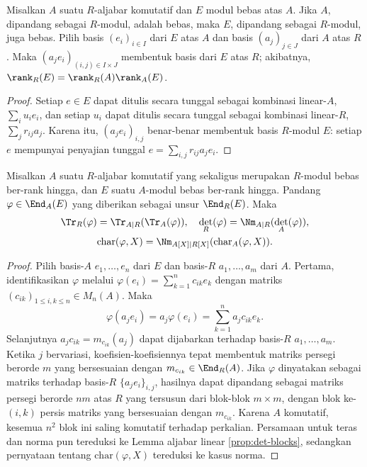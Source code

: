 \begin{lemma}\label{prop:free-transitivity}
	Misalkan $A$ suatu $R$-aljabar komutatif dan $E$ modul bebas atas $A$. Jika $A$, dipandang sebagai $R$-modul, adalah bebas, maka $E$, dipandang sebagai $R$-modul, juga bebas. Pilih basis $(e_i)_{i \in I}$ dari $E$ atas $A$ dan basis $(a_j)_{j \in J}$ dari $A$ atas $R$. Maka $(a_j e_i)_{(i,j) \in I \times J}$ membentuk basis dari $E$ atas $R$; akibatnya, $\rank_R(E) = \rank_R(A) \rank_A(E)$.
\end{lemma}
\begin{proof}
	Setiap $e \in E$ dapat ditulis secara tunggal sebagai kombinasi linear-$A$, $\sum_i u_i e_i$, dan setiap $u_i$ dapat ditulis secara tunggal sebagai kombinasi linear-$R$, $\sum_j r_{ij} a_j$. Karena itu, $(a_j e_i)_{i,j}$ benar-benar membentuk basis $R$-modul $E$: setiap $e$ mempunyai penyajian tunggal $e = \sum_{i,j} r_{ij} a_j e_i$.
\end{proof}

\begin{theorem}\label{prop:norm-trace-transitivity}
	Misalkan $A$ suatu $R$-aljabar komutatif yang sekaligus merupakan $R$-modul bebas ber-rank hingga, dan $E$ suatu $A$-modul bebas ber-rank hingga. Pandang $\varphi \in \End_A(E)$ yang diberikan sebagai unsur $\End_R(E)$. Maka
	\begin{gather*}
		\Tr_R(\varphi) = \Tr_{A|R}(\Tr_A(\varphi)), \quad \det_R(\varphi) = \Nm_{A|R}(\det_A(\varphi)), \\
		\mathrm{char}(\varphi, X) = \Nm_{A[X]|R[X]}(\mathrm{char}_A(\varphi, X)).
	\end{gather*}
\end{theorem}
\begin{proof}
	Pilih basis-$A$ $e_1, \ldots, e_n$ dari $E$ dan basis-$R$ $a_1, \ldots,  a_m$ dari $A$. Pertama, identifikasikan $\varphi$ melalui $\varphi(e_i) = \sum_{k=1}^n c_{ik} e_k$ dengan matriks $(c_{ik})_{1 \leq i,k \leq n} \in M_n(A)$. Maka
	\[ \varphi(a_j e_i) = a_j \varphi(e_i) = \sum_{k=1}^n a_j c_{ik} e_k. \]
	Selanjutnya $a_j c_{ik} = m_{c_{ik}}(a_j)$ dapat dijabarkan terhadap basis-$R$ $a_1, \ldots, a_m$. Ketika $j$ bervariasi, koefisien-koefisiennya tepat membentuk matriks persegi berorde $m$ yang bersesuaian dengan $m_{c_{ik}} \in \End_R(A)$. Jika $\varphi$ dinyatakan sebagai matriks terhadap basis-$R$ $\{ a_j e_i \}_{i,j}$, hasilnya dapat dipandang sebagai matriks persegi berorde $nm$ atas $R$ yang tersusun dari blok-blok $m \times m$, dengan blok ke-$(i,k)$ persis matriks yang bersesuaian dengan $m_{c_{ik}}$. Karena $A$ komutatif, kesemua $n^2$ blok ini saling komutatif terhadap perkalian. Persamaan untuk teras dan norma pun tereduksi ke Lemma aljabar linear \ref{prop:det-blocks}, sedangkan pernyataan tentang $\mathrm{char}(\varphi, X)$ tereduksi ke kasus norma.
\end{proof}

